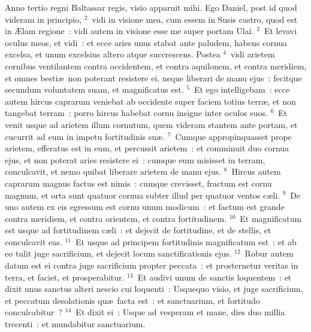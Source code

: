 \lettrine[lines=10,image=true,loversize=0.05,lraise=-0.03]{A}{}nno tertio regni Baltassar regis, visio apparuit mihi. Ego Daniel, post id quod videram in principio,
${}^{2}$~vidi in visione mea, cum essem in Susis castro, quod est in \AE lam regione~: vidi autem in visione esse me super portam Ulai.
${}^{3}$~Et levavi oculus meos, et vidi~: et ecce aries unus stabat ante paludem, habens cornua excelsa, et unum excelsius altero atque succrescens. Postea
${}^{4}$~vidi arietem cornibus ventilantem contra occidentem, et contra aquilonem, et contra meridiem, et omnes besti\ae\ non poterant resistere ei, neque liberari de manu ejus~: fecitque secundum voluntatem suam, et magnificatus est.
${}^{5}$~Et ego intelligebam~: ecce autem hircus caprarum veniebat ab occidente super faciem totius terr\ae , et non tangebat terram~: porro hircus habebat cornu insigne inter oculos suos.
${}^{6}$~Et venit usque ad arietem illum cornutum, quem videram stantem ante portam, et cucurrit ad eum in impetu fortitudinis su\ae .
${}^{7}$~Cumque appropinquasset prope arietem, efferatus est in eum, et percussit arietem~: et comminuit duo cornua ejus, et non poterat aries resistere ei~: cumque eum misisset in terram, conculcavit, et nemo quibat liberare arietem de manu ejus.
${}^{8}$~Hircus autem caprarum magnus factus est nimis~: cumque crevisset, fractum est cornu magnum, et orta sunt quatuor cornua subter illud per quatuor ventos c\ae li.
${}^{9}$~De uno autem ex eis egressum est cornu unum modicum~: et factum est grande contra meridiem, et contra orientem, et contra fortitudinem.
${}^{10}$~Et magnificatum est usque ad fortitudinem c\ae li~: et dejecit de fortitudine, et de stellis, et conculcavit eas.
${}^{11}$~Et usque ad principem fortitudinis magnificatum est~: et ab eo tulit juge sacrificium, et dejecit locum sanctificationis ejus.
${}^{12}$~Robur autem datum est ei contra juge sacrificium propter peccata~: et prosternetur veritas in terra, et faciet, et prosperabitur.
${}^{13}$~Et audivi unum de sanctis loquentem~: et dixit unus sanctus alteri nescio cui loquenti~: Usquequo visio, et juge sacrificium, et peccatum desolationis qu\ae\ facta est~: et sanctuarium, et fortitudo conculcabitur~?
${}^{14}$~Et dixit ei~: Usque ad vesperam et mane, dies duo millia trecenti~: et mundabitur sanctuarium.


